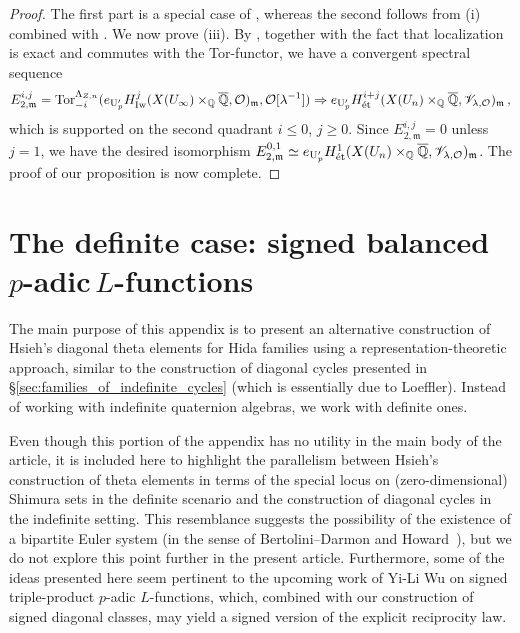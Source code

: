 \documentclass{amsart}
\numberwithin{equation}{section}
\newcommand{\QQ}{\mathbb{Q}}
\newcommand{\etale}{\textup{\'et}}
\newcommand{\Q}{\QQ}
\begin{document}
\begin{proof}
The first part is a special case of \cite[Corollary 3.2]{Fouquet2013}, whereas the second follows from (i) combined with \cite[Proposition 3.7]{Fouquet2013}. We now prove (iii).
By \cite[Theorem 2.6.2]{LRZ}, together with the fact that localization is exact and commutes with the Tor-functor, we have a convergent spectral sequence 
$$E^{i,j}_{2,\mathfrak{m}} = {\rm Tor}^{\Lambda_{Z,n}}_{-i} (e_{{\rm U}_{p}'} H^j_{\rm Iw}( X(U_\infty)\times_{\QQ} \overline{\Q}, \mathcal{O})_\mathfrak{m}, \mathcal{O}[\lambda^{-1}]) \Rightarrow  e_{{\rm U}_{p}'} H^{i+j}_{\etale}( X(U_n) \times_{\QQ} \overline{\Q}, \mathscr{V}_{\lambda,\mathcal{O}})_\mathfrak{m}\,,$$
which is supported on the second quadrant $i \leq 0$, $j \geq 0$. Since $E^{i,j}_{2,\mathfrak{m}} = 0$ unless $j=1$, we have the desired isomorphism $E^{0,1}_{2,\mathfrak{m}} \simeq e_{{\rm U}_{p}'} H^1_{\etale}( X(U_n) \times_{\QQ} \overline{\Q}, \mathscr{V}_{\lambda,\mathcal{O}})_\mathfrak{m}$. The proof of our proposition is now complete.
\end{proof}


 
\section{The definite case: signed balanced \texorpdfstring{$p$-adic\,}\ \texorpdfstring{$L$-functions\,}\ }
\label{sec:Regularized_definite_diagonal_cycles}
The main purpose of this appendix is to present an alternative construction of Hsieh's diagonal theta elements for Hida families using a representation-theoretic approach, similar to the construction of diagonal cycles presented in \S\ref{sec:families_of_indefinite_cycles} (which is essentially due to Loeffler). Instead of working with indefinite quaternion algebras, we work with definite ones. 

Even though this portion of the appendix has no utility in the main body of the article, it is included here to highlight the parallelism between Hsieh's construction of theta elements in terms of the special locus on (zero-dimensional) Shimura sets in the definite scenario and the construction of diagonal cycles in the indefinite setting. This resemblance suggests the possibility of the existence of a bipartite Euler system (in the sense of Bertolini--Darmon and Howard~\cite{BertoliniDarmon2005, howard06}), but we do not explore this point further in the present article. Furthermore, some of the ideas presented here seem pertinent to the upcoming work of Yi-Li Wu on signed triple-product $p$-adic $L$-functions, which, combined with our construction of signed diagonal classes, may yield a signed version of the explicit reciprocity law.
\end{document}
